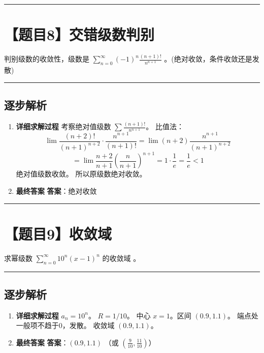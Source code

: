 \documentclass[UTF8]{ctexart}
\newenvironment{redenv}{\color{red}}{}
\newenvironment{detailedanalysis}{%
    \color{red}
    \begin{enumerate}[label=\textbf{第\arabic*步：}, leftmargin=*, align=left, itemsep=1.5ex]
}{%
    \end{enumerate}
}
\newcommand{\problemrule}{\noindent\rule{\textwidth}{1.5pt}\vspace{-0.8em}}
\newcommand{\analysisrule}{\noindent\rule{\textwidth}{0.8pt}\vspace{-0.8em}}
\newcommand{\blank}[1]{\underline{\hspace{#1}}}
\begin{document}
\problemrule
\section*{【题目8】交错级数判别}
判别级数的收敛性，级数是 $ \sum_{n=0}^{\infty} (-1)^{n} \frac{(n+1)!}{n^{n+1}} $ \blank{2cm}。(绝对收敛，条件收敛还是发散)

\begin{redenv}
\analysisrule
\subsection*{逐步解析}

\begin{detailedanalysis}
\item \textbf{详细求解过程}
考察绝对值级数 $\sum \frac{(n+1)!}{n^{n+1}}$。
比值法：
$$ \lim \frac{(n+2)!}{(n+1)^{n+2}} \cdot \frac{n^{n+1}}{(n+1)!} = \lim (n+2) \frac{n^{n+1}}{(n+1)^{n+2}} $$
$$ = \lim \frac{n+2}{n+1} (\frac{n}{n+1})^{n+1} = 1 \cdot \frac{1}{e} = \frac{1}{e} < 1 $$
绝对值级数收敛。
所以原级数绝对收敛。

\item \textbf{最终答案}
\textbf{答案}：绝对收敛
\end{detailedanalysis}
\end{redenv}

\problemrule
\section*{【题目9】收敛域}
求幂级数 $ \sum_{n=0}^{\infty} 10^{n}(x-1)^{n} $ 的收敛域 \blank{2cm}。

\begin{redenv}
\analysisrule
\subsection*{逐步解析}

\begin{detailedanalysis}
\item \textbf{详细求解过程}
$a_n = 10^n$。
$R = 1/10$。
中心 $x=1$。区间 $(0.9, 1.1)$。
端点处一般项不趋于0，发散。
收敛域 $(0.9, 1.1)$。

\item \textbf{最终答案}
\textbf{答案}：$ (0.9, 1.1) $ （或 $( \frac{9}{10}, \frac{11}{10} )$）
\end{detailedanalysis}
\end{redenv}
\end{document}
